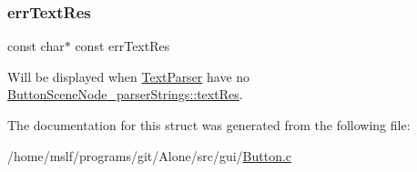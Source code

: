 \subsubsection{\texorpdfstring{err\+Text\+Res}{errTextRes}}
{\footnotesize\ttfamily const char$\ast$ const err\+Text\+Res}

Will be displayed when \hyperlink{struct_text_parser}{Text\+Parser} have no \hyperlink{struct_button_scene_node__parser_strings_ab8666a8039b6fdab629c3e0853421c3c}{Button\+Scene\+Node\+\_\+parser\+Strings\+::text\+Res}. 

The documentation for this struct was generated from the following file\+:\begin{DoxyCompactItemize}
\item 
/home/mslf/programs/git/\+Alone/src/gui/\hyperlink{_button_8c}{Button.\+c}\end{DoxyCompactItemize}
